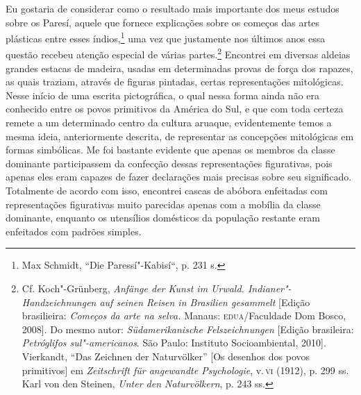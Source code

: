 Eu gostaria de considerar como o resultado mais importante dos meus
estudos sobre os Paresí, aquele que fornece explicações sobre os
começos das artes plásticas entre esses índios,\footnote{Max Schmidt,
  ``Die Paressí"-Kabisí``, p. 231 s.} uma vez que justamente nos últimos
anos essa questão recebeu atenção especial de várias partes.\footnote{Cf.
  Koch"-Grünberg, \emph{Anfänge der Kunst im Urwald.
  Indianer"-Handzeichnungen auf seinen Reisen in Brasilien gesammelt}
  {[}Edição brasilieira: \emph{Começos da arte na selva.} Manaus:
  \textsc{edua}/Faculdade Dom Bosco, 2008{]}. Do mesmo autor:
  \emph{Südamerikanische Felszeichnungen} {[}Edição brasileira:
  \emph{Petróglifos sul"-americanos}. São Paulo: Instituto
  Socioambiental, 2010{]}. Vierkandt, ``Das Zeichnen der Naturvölker''
  {[}Os desenhos dos povos primitivos{]} em \emph{Zeitschrift für
  angewandte Psychologie}, v.\,\textsc{vi} (1912), p. 299 ss. Karl von den
  Steinen, \emph{Unter den Naturvölkern}, p. 243 ss.} Encontrei em
diversas aldeias grandes estacas de madeira, usadas em determinadas
provas de força dos rapazes, as quais traziam, através de figuras
pintadas, certas representações mitológicas. Nesse início de uma escrita
pictográfica, o qual nessa forma ainda não era conhecido entre os povos
primitivos da América do Sul, e que com toda certeza remete a um
determinado centro da cultura aruaque, evidentemente temos a mesma
ideia, anteriormente descrita, de representar as concepções mitológicas
em formas simbólicas. Me foi bastante evidente que apenas os membros da
classe dominante participassem da confecção dessas representações
figurativas, pois apenas eles eram capazes de fazer declarações mais
precisas sobre seu significado. Totalmente de acordo com isso, encontrei
cascas de abóbora enfeitadas com representações figurativas muito
parecidas apenas com a mobília da classe dominante, enquanto os
utensílios domésticos da população restante eram enfeitados com padrões
simples.

